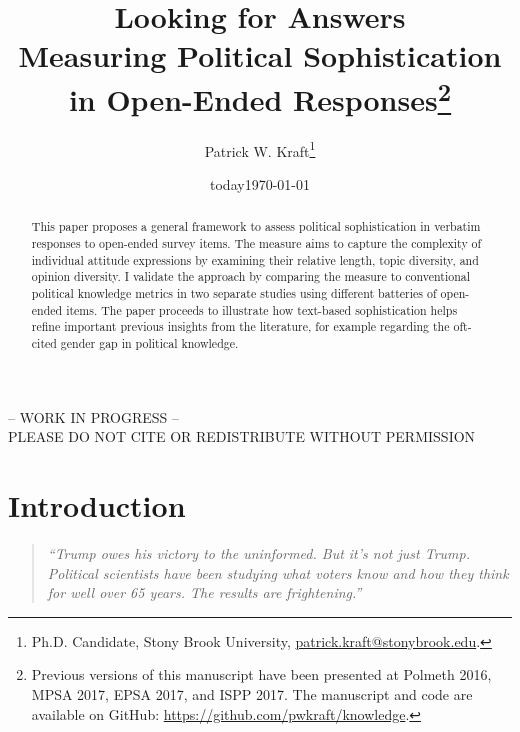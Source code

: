 \documentclass[12pt]{article}
\author{Patrick W. Kraft\footnote{Ph.D. Candidate, Stony Brook University, \href{mailto:patrick.kraft@stonybrook.edu}{patrick.kraft@stonybrook.edu}.
}}
\date{today}
\title{Looking for Answers\\
\large{Measuring Political Sophistication in Open-Ended Responses}\footnote{Previous versions of this manuscript have been presented at Polmeth 2016, MPSA 2017, EPSA 2017, and ISPP 2017.
The manuscript and code are available on GitHub: \url{https://github.com/pwkraft/knowledge}.}
}
\date{\today}
\begin{document}
\maketitle\doublespacing\thispagestyle{empty}

\begin{center}
-- WORK IN PROGRESS -- \\
PLEASE DO NOT CITE OR REDISTRIBUTE WITHOUT PERMISSION
\end{center} 

\hfill
\begin{abstract}\singlespacing
This paper proposes a general framework to assess political sophistication in verbatim responses to open-ended survey items. The measure aims to capture the complexity of individual attitude expressions by examining their relative length, topic diversity, and opinion diversity. I validate the approach by comparing the measure to conventional political knowledge metrics in two separate studies using different batteries of open-ended items. The paper proceeds to illustrate how text-based sophistication helps refine important previous insights from the literature, for example regarding the oft-cited gender gap in political knowledge.


\end{abstract}
\hfill
\newpage\setcounter{page}{1}


\section*{Introduction}

\begin{quote}\singlespacing
\textit{``Trump owes his victory to the uninformed. But it's not just Trump. Political scientists have been studying what voters know and how they think for well over 65 years. The results are frightening.''}
\end{quote}
\end{document}
